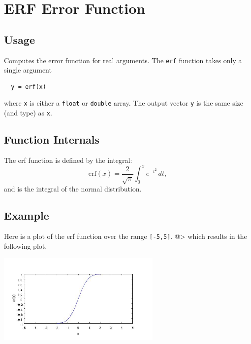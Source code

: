 \section{ERF Error Function}

\subsection{Usage}

Computes the error function for real arguments.  The \verb|erf|
function takes only a single argument
\begin{verbatim}
  y = erf(x)
\end{verbatim}
where \verb|x| is either a \verb|float| or \verb|double| array.  The output
vector \verb|y| is the same size (and type) as \verb|x|.
\subsection{Function Internals}

The erf function is defined by the integral:
\[
  \mathrm{erf}(x) = \frac{2}{\sqrt{\pi}}\int_{0}^{x} e^{-t^2} \, dt,
\]
and is the integral of the normal distribution.
\subsection{Example}

Here is a plot of the erf function over the range \verb|[-5,5]|.
@>
which results in the following plot.


\centerline{\includegraphics[width=8cm]{erf1}}

